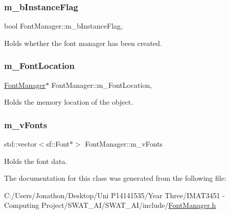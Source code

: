 \subsubsection{\texorpdfstring{m\+\_\+b\+Instance\+Flag}{m\_bInstanceFlag}}
{\footnotesize\ttfamily bool Font\+Manager\+::m\+\_\+b\+Instance\+Flag\hspace{0.3cm}{\ttfamily [static]}, {\ttfamily [private]}}



Holds whether the font manager has been created. 

\mbox{\label{class_font_manager_a15598b7655500b0a967eaed14e575bea}} 
\subsubsection{\texorpdfstring{m\+\_\+\+Font\+Location}{m\_FontLocation}}
{\footnotesize\ttfamily \hyperlink{class_font_manager}{Font\+Manager}$\ast$ Font\+Manager\+::m\+\_\+\+Font\+Location\hspace{0.3cm}{\ttfamily [static]}, {\ttfamily [private]}}



Holds the memory location of the object. 

\mbox{\label{class_font_manager_ac8b4239fb72096d33801557c9f3a2845}} 
\subsubsection{\texorpdfstring{m\+\_\+v\+Fonts}{m\_vFonts}}
{\footnotesize\ttfamily std\+::vector$<$sf\+::\+Font$\ast$$>$ Font\+Manager\+::m\+\_\+v\+Fonts\hspace{0.3cm}{\ttfamily [private]}}



Holds the font data. 



The documentation for this class was generated from the following file\+:\begin{DoxyCompactItemize}
\item 
C\+:/\+Users/\+Jonathon/\+Desktop/\+Uni P14141535/\+Year Three/\+I\+M\+A\+T3451 -\/ Computing Project/\+S\+W\+A\+T\+\_\+\+A\+I/\+S\+W\+A\+T\+\_\+\+A\+I/include/\hyperlink{_font_manager_8h}{Font\+Manager.\+h}\end{DoxyCompactItemize}
